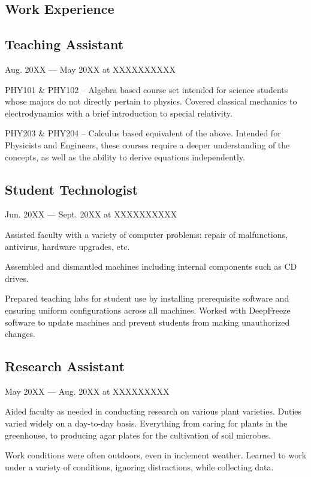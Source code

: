 \documentclass[letterpaper]{easyCV}
\begin{document}
\begin{main}[10pt]
\section{Work Experience}

\subsection{Teaching Assistant}{Aug. 20XX --- May 20XX at XXXXXXXXXX}
\begin{mainlist}
\item PHY101 \& PHY102 -- Algebra based course set intended for science students whose majors do not directly pertain to physics.  Covered classical mechanics to electrodynamics with a brief introduction to special relativity.
\item PHY203 \& PHY204 -- Calculus based equivalent of the above.  Intended for Physicists and Engineers, these courses require a deeper understanding of the concepts, as well as the ability to derive equations independently.
\end{mainlist}

\subsection{Student Technologist}{Jun. 20XX --- Sept. 20XX at XXXXXXXXXX}
\begin{mainlist}
\item Assisted faculty with a variety of computer problems: repair of malfunctions, antivirus, hardware upgrades, etc. 
\item Assembled and dismantled machines including internal components such as CD drives.
\item Prepared teaching labs for student use by installing prerequisite software and ensuring uniform configurations across all machines.  Worked with DeepFreeze software to update machines and prevent students from making unauthorized changes.
\end{mainlist}

\subsection{Research Assistant}{May 20XX --- Aug. 20XX at XXXXXXXXX}
\begin{mainlist}
\item Aided faculty as needed in conducting research on various plant varieties.  Duties varied widely on a day-to-day basis.  Everything from caring for plants in the greenhouse, to producing agar plates for the cultivation of soil microbes.
\item Work conditions were often outdoors, even in inclement weather.  Learned to work under a variety of conditions, ignoring distractions, while collecting data.
\end{mainlist}


\end{main}
\end{document}
